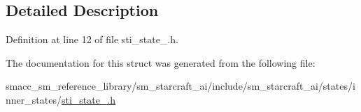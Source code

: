 \subsection{Detailed Description}


Definition at line 12 of file sti\+\_\+state\+\_.\+h.



The documentation for this struct was generated from the following file\+:\begin{DoxyCompactItemize}
\item 
smacc\+\_\+sm\+\_\+reference\+\_\+library/sm\+\_\+starcraft\+\_\+ai/include/sm\+\_\+starcraft\+\_\+ai/states/inner\+\_\+states/\hyperlink{sm__starcraft__ai_2include_2sm__starcraft__ai_2states_2inner__states_2sti__state__3_8h}{sti\+\_\+state\+\_.\+h}\end{DoxyCompactItemize}
